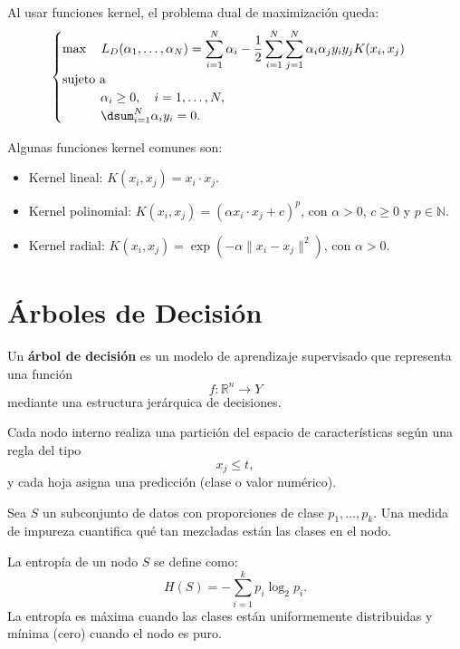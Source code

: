 \documentclass[a4,11pt]{aleph-notas}
\begin{document}
Al usar funciones kernel, el problema dual de maximización queda:
\[
    \begin{cases}
        \max \quad \displaystyle L_D({\alpha_1},\ldots,\alpha_N) = \sum_{i=1}^N \alpha_i - \frac{1}{2} \sum_{i=1}^N \sum_{j=1}^N \alpha_i \alpha_j y_i y_j K({x}_i, {x}_j) \\
        \text{sujeto a}\\ 
        \qquad\quad \alpha_i \geq 0, \quad i = 1,\ldots, N,\\
        \qquad\quad \dsum_{i=1}^N \alpha_i y_i = 0.
    \end{cases}
\]

Algunas funciones kernel comunes son:
\begin{itemize}
    \item Kernel lineal: $K({x}_i, {x}_j) = {x}_i \cdot {x}_j$.
    \item Kernel polinomial: $K({x}_i, {x}_j) = (\alpha {x}_i \cdot {x}_j + c)^p$, con $\alpha > 0$, $c \geq 0$ y $p \in \mathbb{N}$.
    \item Kernel radial: $K({x}_i, {x}_j) = \exp\left(-\alpha \|{x}_i - {x}_j\|^2\right)$, con $\alpha > 0$.
\end{itemize}

\newpage
\section{Árboles de Decisión}

\begin{defi}
Un \textbf{árbol de decisión} es un modelo de aprendizaje supervisado que representa una función
\[
f : \mathbb{R}^n \to Y
\]
mediante una estructura jerárquica de decisiones.  

Cada nodo interno realiza una partición del espacio de características según una regla del tipo
\[
x_j \le t,
\]
y cada hoja asigna una predicción (clase o valor numérico).
\end{defi}

\begin{defi}
Sea \(S\) un subconjunto de datos con proporciones de clase \(p_1,\ldots,p_k\).  
Una medida de impureza cuantifica qué tan mezcladas están las clases en el nodo.
\end{defi}

\begin{defi}[Entropía]
La entropía de un nodo \(S\) se define como:
\[
H(S) = -\sum_{i=1}^{k} p_i \log_2 p_i.
\]
La entropía es máxima cuando las clases están uniformemente distribuidas y mínima (cero) cuando el nodo es puro.
\end{defi}
\end{document}
